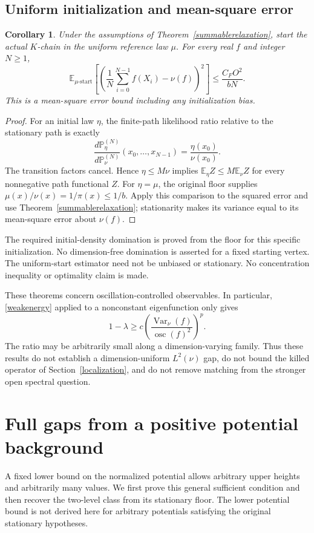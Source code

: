 \documentclass[11pt]{article}
\newtheorem{corollary}[theorem]{Corollary}
\begin{document}
\subsection{Uniform initialization and mean-square error}
\begin{corollary}\label{uniformstart}
Under the assumptions of Theorem~\ref{summablerelaxation}, start the
actual $K$-chain in the uniform reference law $\mu$. For every real $f$
and integer $N\geq1$,
\[
 \mathbb E_{\mu\text{-start}}
 \left[\left(\frac1N\sum_{i=0}^{N-1}f(X_i)-\nu(f)\right)^2\right]
 \leq \frac{C_F O^2}{bN}.
\]
This is a mean-square error bound including any initialization bias.
\end{corollary}
\begin{proof}
For an initial law $\eta$, the finite-path likelihood ratio relative
to the stationary path is exactly
\[
 \frac{d\mathbb P_\eta^{(N)}}{d\mathbb P_\nu^{(N)}}
 (x_0,\ldots,x_{N-1})=\frac{\eta(x_0)}{\nu(x_0)}.
\]
The transition factors cancel. Hence $\eta\leq M\nu$ implies
$\mathbb E_\eta Z\leq M\mathbb E_\nu Z$ for every nonnegative path
functional $Z$. For $\eta=\mu$, the original floor supplies
$\mu(x)/\nu(x)=1/\pi(x)\leq1/b$. Apply this comparison to the squared
error and use Theorem~\ref{summablerelaxation}; stationarity makes its
variance equal to its mean-square error about $\nu(f)$.
\end{proof}
The required initial-density domination is proved from the floor for
this specific initialization. No dimension-free domination is asserted
for a fixed starting vertex. The uniform-start estimator need not be
unbiased or stationary. No concentration inequality or optimality claim
is made.

These theorems concern oscillation-controlled observables. In particular,
\eqref{weakenergy} applied to a nonconstant eigenfunction only gives
\[
 1-\lambda\geq
 c\left(\frac{\operatorname{Var}_\nu(f)}
               {\operatorname{osc}(f)^2}\right)^p.
\]
The ratio may be arbitrarily small along a dimension-varying family.
Thus these results do not establish a dimension-uniform $L^2(\nu)$ gap,
do not bound the killed operator of Section~\ref{localization}, and do
not remove matching from the stronger open spectral question.

\section{Full gaps from a positive potential background}\label{backgroundgap}\label{twolevelgap}
A fixed lower bound on the normalized potential allows arbitrary upper
heights and arbitrarily many values. We first prove this general sufficient
condition and then recover the two-level class from its stationary floor.
The lower potential bound is not derived here for arbitrary potentials
satisfying the original stationary hypotheses.
\end{document}
